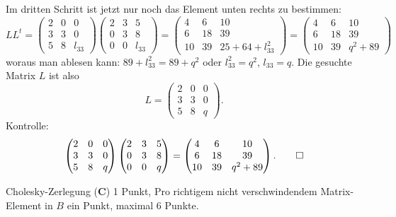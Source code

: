 \begin{loesung}
Im dritten Schritt ist jetzt nur noch das Element unten rechts zu bestimmen:
\[
LL^t=
\begin{pmatrix}
2&0&     0\\
3&3&     0\\
5&8&l_{33}
\end{pmatrix}
\begin{pmatrix}
2&3&     5\\
0&3&     8\\
0&0&l_{33}
\end{pmatrix}
=
\begin{pmatrix}
 4& 6& 10\\
 6&18& 39\\
10&39& 25+64+l_{33}^2
\end{pmatrix}
=
\begin{pmatrix}
 4& 6&10\\
 6&18&39\\
10&39& q^2 + 89
\end{pmatrix}
\]
woraus man ablesen kann: $89+l_{33}^2=89+q^2$ oder $l_{33}^2=q^2$, $l_{33}=q$.
Die gesuchte Matrix $L$ ist also
\[
L=
\begin{pmatrix}
2&0&0\\
3&3&0\\
5&8&q
\end{pmatrix}.
\]
Kontrolle:
\[
\begin{pmatrix}
2&0&0\\
3&3&0\\
5&8&q
\end{pmatrix}
\begin{pmatrix}
2&3&5\\
0&3&8\\
0&0&q
\end{pmatrix}
=
\begin{pmatrix}
 4& 6&10\\
 6&18&39\\
10&39&q^2 + 89
\end{pmatrix}.
\qedhere
\]
\end{loesung}

\begin{bewertung}
Cholesky-Zerlegung ({\bf C}) 1 Punkt,
Pro richtigem nicht verschwindendem Matrix-Element in $B$ ein Punkt,
maximal 6 Punkte.
\end{bewertung}

